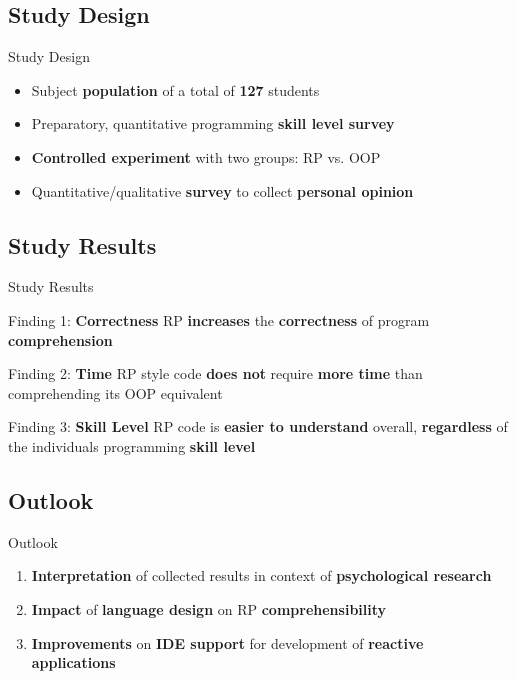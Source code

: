 \documentclass{beamer}
\begin{document}
\subsection*{Study Design}
\begin{frame}{Study Design}
	\begin{itemize}
		\item Subject \textbf{population} of a total of \textbf{127} students\bigskip
		\item Preparatory, quantitative programming \textbf{skill level survey}\bigskip
		\item \textbf{Controlled experiment} with two groups: RP vs. OOP\bigskip
		\item Quantitative/qualitative \textbf{survey} to collect \textbf{personal opinion}
	\end{itemize}
\end{frame}

\subsection*{Study Results}
\begin{frame}{Study Results}

	\begin{block}{Finding 1: \textbf{Correctness}}
		RP \textbf{increases} the \textbf{correctness} of program \textbf{comprehension}
	\end{block}
	\begin{block}{Finding 2: \textbf{Time}}
		RP style code \textbf{does not} require \textbf{more time} than comprehending its OOP equivalent
	\end{block}
	\begin{block}{Finding 3: \textbf{Skill Level}}
		RP code is \textbf{easier to understand} overall, \textbf{regardless} of the individuals programming \textbf{skill level}
	\end{block}
\end{frame}

\subsection*{Outlook}
\begin{frame}{Outlook}
	\begin{enumerate}
		\item \textbf{Interpretation} of collected results in context of \textbf{psychological research}\bigskip
		\item \textbf{Impact} of \textbf{language design} on RP \textbf{comprehensibility}\bigskip
		\item \textbf{Improvements} on \textbf{IDE support} for development of \textbf{reactive applications}
	\end{enumerate}
\end{frame}
\end{document}
